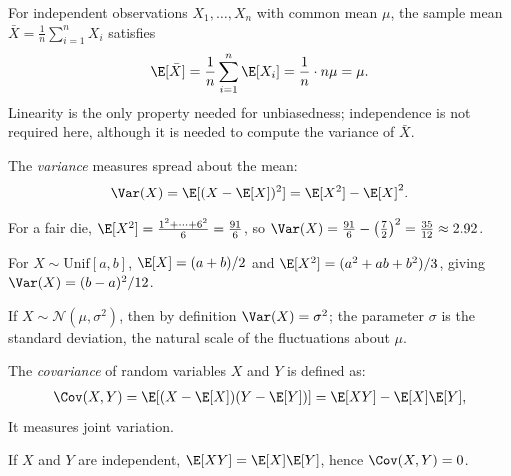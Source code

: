 \documentclass[a4paper, 12pt]{book}
\begin{document}
\begin{example}
    For independent observations $X_1,\ldots,X_n$ with common mean $\mu$, the
    sample mean $\bar X = \frac1n\sum_{i=1}^n X_i$ satisfies
    \begin{align}
        \E[\bar X]
        = \frac1n\sum_{i=1}^n \E[X_i]
        = \frac1n\cdot n\mu = \mu.
    \end{align}
    Linearity is the only property needed for unbiasedness; independence is not
    required here, although it is needed to compute the variance of $\bar X$.
\end{example}

\begin{definition}
        The \emph{variance} measures spread about the mean:
\begin{align}
    \Var(X) = \E[(X - \E[X])^2] = \E[X^2] - \E[X]^2.
\end{align}
\end{definition}

\begin{example}
    For a fair die, $\E[X^2]=\frac{1^2+\cdots+6^2}{6}=\frac{91}{6}$, so $\Var(X)=\frac{91}{6}-\left(\frac72\right)^2=\frac{35}{12}\approx2.92$.
\end{example}

\begin{example}
    For $X\sim\mathrm{Unif}[a,b]$, $\E[X]=(a+b)/2$ and $\E[X^2]=(a^2+ab+b^2)/3$, giving $\Var(X)=(b-a)^2/12$.
\end{example}

\begin{example}
    If $X\sim\mathscr{N}(\mu,\sigma^2)$, then by definition $\Var(X)=\sigma^2$; the parameter $\sigma$ is the standard deviation, the natural scale of the fluctuations about $\mu$.
\end{example}

\begin{definition}
    The \emph{covariance} of random variables $X$ and $Y$ is defined as:
\begin{align}
    \Cov(X,Y) = \E[(X-\E[X])(Y-\E[Y])] = \E[XY] - \E[X]\E[Y],
\end{align}
It measures joint variation.
\end{definition}
\begin{example}
    If $X$ and $Y$ are independent, $\E[XY]=\E[X]\E[Y]$, hence $\Cov(X,Y)=0$.
\end{example}
\end{document}
